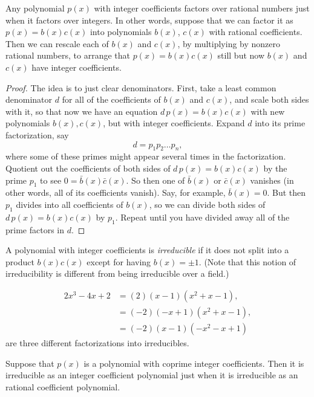 \begin{lemma}
Any polynomial \(p(x)\) with integer coefficients factors over rational numbers just when it factors over integers.
In other words, suppose that we can factor it as \(p(x)=b(x)c(x)\) into polynomials \(b(x)\), \(c(x)\) with rational coefficients.
Then we can rescale each of \(b(x)\) and \(c(x)\), by multiplying by nonzero rational numbers, to arrange that \(p(x)=b(x)c(x)\) still but now \(b(x)\) and \(c(x)\) have integer coefficients.
\end{lemma}
\begin{proof}
The idea is to just clear denominators.
First, take a least common denominator \(d\) for all of the coefficients of \(b(x)\) and \(c(x)\), and scale both sides with it, so that now we have an equation \(d \, p(x)=b(x)c(x)\) with new polynomials \(b(x), c(x)\), but with integer coefficients.
Expand \(d\) into its prime factorization, say
\[
d=p_1 p_2 \dots p_n, 
\]
where some of these primes might appear several times in the factorization.
Quotient out the coefficients of both sides of \(d \, p(x)=b(x)c(x)\) by the prime \(p_1\) to see \(0=\bar{b}(x)\bar{c}(x)\).
So then one of \(\bar{b}(x)\) or \(\bar{c}(x)\) vanishes (in other words, all of its coefficients vanish).
Say, for example, \(\bar{b}(x)=0\).
But then \(p_1\) divides into all coefficients of \(b(x)\), so we can divide both sides of \(d \, p(x)=b(x)c(x)\) by \(p_1\).
Repeat until you have divided away all of the prime factors in \(d\).
\end{proof}
A polynomial with integer coefficients is \emph{irreducible}%
%
% 
%
if it does not split into a product \(b(x)c(x)\) except for having \(b(x)=\pm 1\).
(Note that this notion of irreducibility is different from being irreducible over a field.)
\begin{example}
\begin{align*}
2x^3-4x+2
&=(2)(x-1)(x^2+x-1),\\
&=(-2)(-x+1)(x^2+x-1),\\
&=(-2)(x-1)(-x^2-x+1)
\end{align*}
are three different factorizations into irreducibles.
\end{example}
\begin{corollary}\label{corollary:coprime.coeffs}
Suppose that \(p(x)\) is a polynomial with coprime integer coefficients.
Then it is irreducible as an integer coefficient polynomial just when it is irreducible as an rational coefficient polynomial.
\end{corollary}
